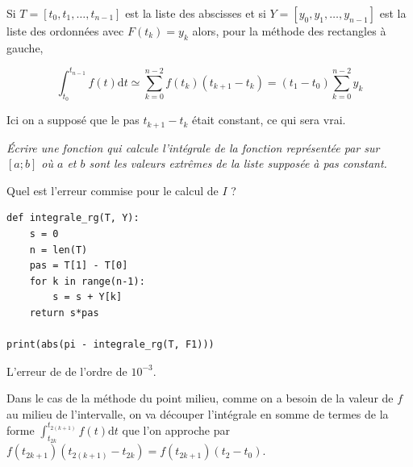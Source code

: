 Si $T=[t_0, t_1, \ldots, t_{n-1}]$ est la liste des abscisses et si $Y=[y_0, y_1, \ldots, y_{n-1}]$ est la liste des ordonnées avec $F(t_k) = y_k$ alors, pour la méthode des rectangles à gauche,

\[\int_{t_0}^{t_{n-1}}f(t)\text{d}t \simeq \sum_{k=0}^{n-2}f(t_k)(t_{k+1} - t_k)=(t_1-t_0)\sum_{k=0}^{n-2}y_k\]

Ici on a supposé que le pas $t_{k+1} - t_k$ était constant, ce qui sera vrai.
\begin{Exercise}\it
Écrire une fonction  qui calcule l'intégrale de la fonction représentée par  sur $[a; b]$ où $a$ et $b$ sont les valeurs extrêmes de la liste  supposée à pas constant.

Quel est l'erreur commise pour le calcul de $I$ ?
\end{Exercise}
\begin{Answer}
\begin{lstlisting}
def integrale_rg(T, Y):
    s = 0
    n = len(T)
    pas = T[1] - T[0]
    for k in range(n-1):
        s = s + Y[k]
    return s*pas
    
print(abs(pi - integrale_rg(T, F1)))
\end{lstlisting}

L'erreur de de l'ordre de $10^{-3}$.
\end{Answer}
Dans le cas de la méthode du point milieu, comme on a besoin de la valeur de $f$ au milieu de l'intervalle, on va découper l'intégrale en somme de termes de la forme $\displaystyle \int_{t_{2k}}^{t_{2(k+1)}}f(t)\text{d}t$ que l'on approche par $f(t_{2k+1})(t_{2(k+1)} - t_{2k})=f(t_{2k+1})(t_2 - t_0)$. 

